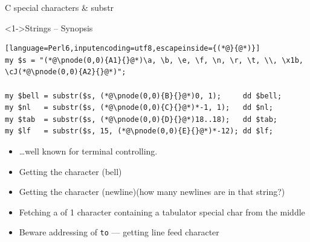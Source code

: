 \begin{frame}[fragile]{C special characters \& substr}
\begin{block}<1->{Strings -- Synopsis}
\small
\begin{lstlisting}[language=Perl6,inputencoding=utf8,escapeinside={(*@}{@*)}]
my $s = "(*@\pnode(0,0){A1}{}@*)\a, \b, \e, \f, \n, \r, \t, \\, \x1b, \cJ(*@\pnode(0,0){A2}{}@*)";

my $bell = substr($s, (*@\pnode(0,0){B}{}@*)0, 1);     dd $bell;
my $nl   = substr($s, (*@\pnode(0,0){C}{}@*)*-1, 1);   dd $nl;
my $tab  = substr($s, (*@\pnode(0,0){D}{}@*)18..18);   dd $tab;
my $lf   = substr($s, 15, (*@\pnode(0,0){E}{}@*)*-12); dd $lf;
\end{lstlisting}
\end{block}

\begin{itemize}
\item<2-> \ldots well known  for terminal controlling.
\item<3-> Getting the  character (bell)
\item<4-> Getting the  character (newline)(how many newlines are in that string?)
\item<6-> Fetching a  of 1 character containing a tabulator special char from the middle
\item<7-> Beware  addressing of \texttt{to} --- getting line feed character
\end{itemize}
\end{frame}

